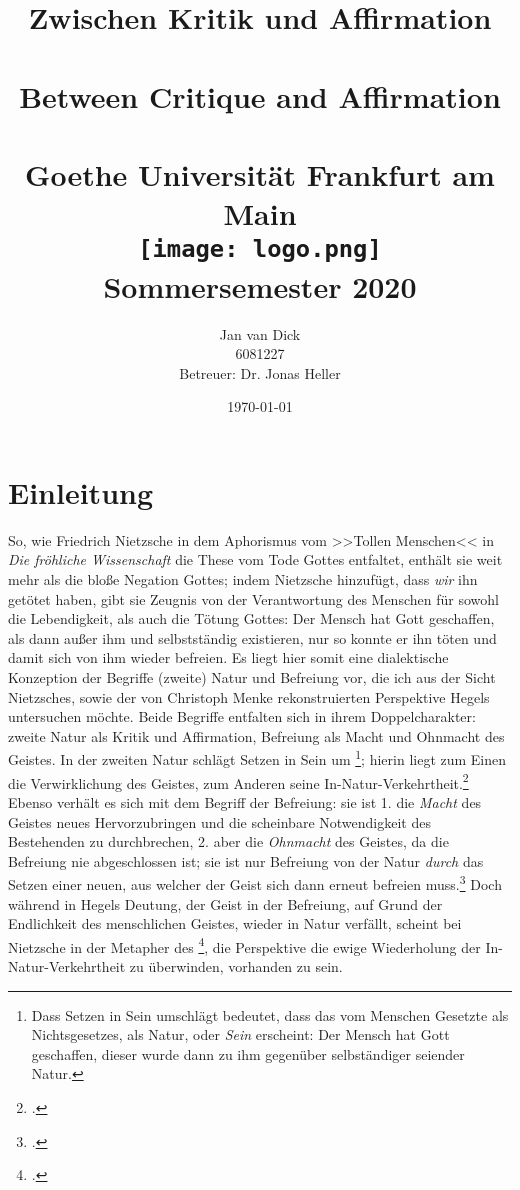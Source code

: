 \documentclass[12pt, a4paper, openany]{report}
\title{
    {\textbf{Zwischen Kritik und Affirmation}}\\ 
    {\large \color{darkgray}{Zweite Natur und Befreiung bei Hegel und Nietzsche}}\\
    {\bigskip}
    {\textbf{Between Critique and Affirmation}}\\
    {\large \color{darkgray}{Second Natur and Liberation in the Philosophies of Hegel and Nietzsche}}\\
    {\bigskip}
    {\large Goethe Universität Frankfurt am Main}\\
    {\bigskip}    
    {\bigskip}
    {\bigskip}    
    {\texttt{[image: logo.png]}}\\
    {\bigskip}    
    {Sommersemester 2020}\\
}
\author{
    {Jan van Dick}\\
    {6081227}\\
    {Betreuer: Dr. Jonas Heller}
}
\date{\today}
\begin{document}
\maketitle
\frontmatter

\onehalfspacing
\tableofcontents

\mainmatter

\chapter{Einleitung}
So, wie Friedrich Nietzsche in dem Aphorismus vom >>Tollen Menschen<< in \emph{Die fröhliche Wissenschaft} die These vom Tode Gottes entfaltet, enthält sie weit mehr als die bloße Negation Gottes;
indem Nietzsche hinzufügt, dass \emph{wir} ihn getötet haben, gibt sie Zeugnis von der Verantwortung des Menschen für sowohl die Lebendigkeit, als auch die Tötung Gottes: 
Der Mensch hat Gott geschaffen, als dann außer ihm und selbstständig existieren, nur so konnte er ihn töten und damit sich von ihm wieder befreien.
Es liegt hier somit eine dialektische Konzeption der Begriffe (zweite) Natur und Befreiung vor, die ich aus der Sicht Nietzsches, sowie der von Christoph Menke rekonstruierten Perspektive Hegels untersuchen möchte.
Beide Begriffe entfalten sich in ihrem Doppelcharakter: zweite Natur als Kritik und Affirmation, Befreiung als Macht und Ohnmacht des Geistes.
In der zweiten Natur schlägt Setzen in Sein um%
\footnote{
    Dass Setzen in Sein umschlägt bedeutet, dass das vom Menschen Gesetzte als Nichtsgesetzes, als Natur, oder \emph{Sein} erscheint: 
    Der Mensch hat Gott geschaffen, dieser wurde dann zu ihm gegenüber selbständiger seiender Natur. 
}; 
hierin liegt zum Einen die Verwirklichung des Geistes, zum Anderen seine In-Natur-Verkehrtheit.\footcite[Vgl.][145]{menke_autonomie_2018}
Ebenso verhält es sich mit dem Begriff der Befreiung: 
sie ist 1. die \emph{Macht} des Geistes neues Hervorzubringen und die scheinbare Notwendigkeit des Bestehenden zu durchbrechen, 
2. aber die \emph{Ohnmacht} des Geistes, da die Befreiung nie abgeschlossen ist; 
sie ist nur Befreiung von der Natur \emph{durch} das Setzen einer neuen, aus welcher der Geist sich dann erneut befreien muss.\footcite[Vgl.][80]{menke_autonomie_2018}
Doch während in Hegels Deutung, der Geist in der Befreiung, auf Grund der Endlichkeit des menschlichen Geistes, wieder in Natur verfällt, scheint bei Nietzsche in der Metapher des \footcite[Vgl.][574]{nietzsche_morgenrote_1999}, die Perspektive die ewige Wiederholung der In-Natur-Verkehrtheit zu überwinden, vorhanden zu sein.
\end{document}
